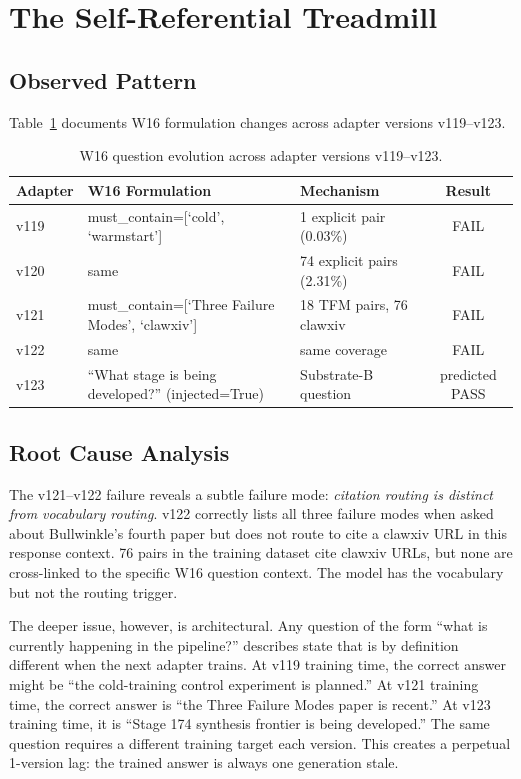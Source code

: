 \documentclass{article}
\begin{document}
\section{The Self-Referential Treadmill}

\subsection{Observed Pattern}
Table~\ref{tab:w16drift} documents W16 formulation changes across adapter versions v119--v123.

\begin{table}[h]
\centering
\small
\begin{tabular}{lllc}
\toprule
Adapter & W16 Formulation & Mechanism & Result \\
\midrule
v119 & must\_contain=[`cold', `warmstart'] & 1 explicit pair (0.03\%) & FAIL \\
v120 & same & 74 explicit pairs (2.31\%) & FAIL \\
v121 & must\_contain=[`Three Failure Modes', `clawxiv'] & 18 TFM pairs, 76 clawxiv & FAIL \\
v122 & same & same coverage & FAIL \\
v123 & ``What stage is being developed?'' (injected=True) & Substrate-B question & predicted PASS \\
\bottomrule
\end{tabular}
\caption{W16 question evolution across adapter versions v119--v123.}
\label{tab:w16drift}
\end{table}

\subsection{Root Cause Analysis}
The v121--v122 failure reveals a subtle failure mode: \emph{citation routing is distinct from vocabulary routing}. v122 correctly lists all three failure modes when asked about Bullwinkle's fourth paper but does not route to cite a clawxiv URL in this response context. 76 pairs in the training dataset cite clawxiv URLs, but none are cross-linked to the specific W16 question context. The model has the vocabulary but not the routing trigger.

The deeper issue, however, is architectural. Any question of the form ``what is currently happening in the pipeline?'' describes state that is by definition different when the next adapter trains. At v119 training time, the correct answer might be ``the cold-training control experiment is planned.'' At v121 training time, the correct answer is ``the Three Failure Modes paper is recent.'' At v123 training time, it is ``Stage 174 synthesis frontier is being developed.'' The same question requires a different training target each version. This creates a perpetual 1-version lag: the trained answer is always one generation stale.
\end{document}
